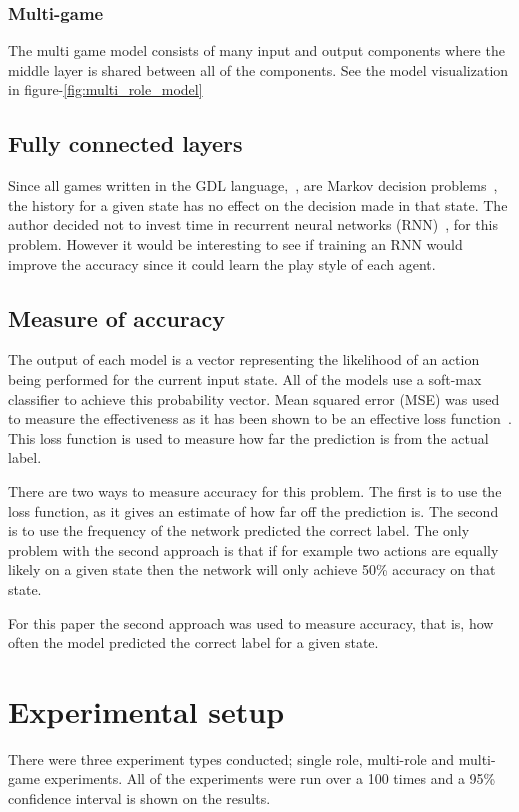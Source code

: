 \documentclass[twocolumn, letterpaper, 10 pt, conference]{ieeeconf}  %
\begin{document}
        \subsubsection{Multi-game} The multi game model consists of many input and output components where the middle layer is shared between all of the components. See the model visualization in figure-\ref{fig:multi_role_model} 

    \subsection{Fully connected layers}
        Since all games written in the GDL language,~\cite{Love2006}, are Markov decision problems~\cite{thie1983markov}, the history for a given state has no effect on the decision made in that state. The author decided not to invest time in recurrent neural networks (RNN)~\cite{medsker2001recurrent}, for this problem. However it would be interesting to see if training an RNN would improve the accuracy since it could learn the play style of each agent.

    
    \subsection{Measure of accuracy}
        The output of each model is a vector representing the likelihood of an action being performed for the current input state. All of the models use a soft-max classifier to achieve this probability vector. Mean squared error (MSE) was used to measure the effectiveness as it has been shown to be an effective loss function~\cite{silver2016mastering}. This loss function is used to measure how far the prediction is from the actual label.
        
        There are two ways to measure accuracy for this problem. The first is to use the loss function, as it gives an estimate of how far off the prediction is. The second is to use the frequency of the network predicted the correct label. The only problem with the second approach is that if for example two actions are equally likely on a given state then the network will only achieve 50\% accuracy on that state.
        
        For this paper the second approach was used to measure accuracy, that is, how often the model predicted the correct label for a given state.
    
\section{Experimental setup}
    There were three experiment types conducted; single role, multi-role and multi-game experiments. All of the  experiments were run over a 100 times and a 95\% confidence interval is shown on the results.
    
\end{document}
